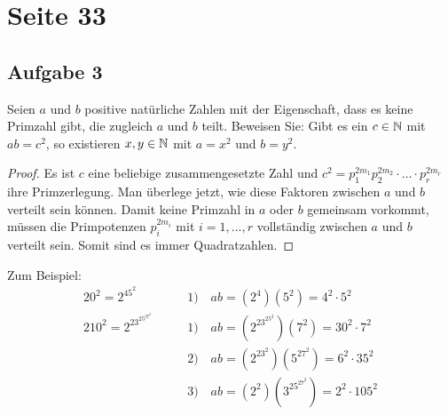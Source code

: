 \section{Seite 33}

\subsection{Aufgabe 3}
Seien $a$ und $b$ positive natürliche Zahlen mit der Eigenschaft, dass
es keine Primzahl gibt, die zugleich $a$ und $b$ teilt. Beweisen Sie:
Gibt es ein $c \in \mathbb{N}{}$ mit $ab = c^2$, so
existieren $x,y \in \mathbb{N}{}$ mit $a = x^2$ und $b = y^2$.
\begin{proof}
  Es ist $c$ eine beliebige zusammengesetzte Zahl und
  $c^2 = p_1^{2m_1}p_2^{2m_2} \cdot \ldots \cdot p_r^{2m_r}$
  ihre Primzerlegung. Man überlege jetzt,
  wie diese Faktoren zwischen $a$ und $b$ verteilt sein können.
  Damit keine Primzahl in $a$ oder $b$ gemeinsam vorkommt, müssen die
  Primpotenzen $p_i^{2m_i}$ mit $i = 1,\dotsc,r$ vollständig zwischen
  $a$ und $b$ verteilt sein. Somit sind es immer Quadratzahlen.
\end{proof}
\noindent
Zum Beispiel:
\begin{align*}
  20^2 = 2^45^2 \qquad        & 1) \quad ab = (2^4)(5^2) = 4^2 \cdot 5^2         \\[8pt]
  210^2 = 2^23^25^27^2 \qquad & 1) \quad ab = (2^23^25^2)(7^2) = 30^2 \cdot 7^2  \\
                              & 2) \quad ab = (2^23^2)(5^27^2) = 6^2 \cdot 35^2  \\
                              & 3) \quad ab = (2^2)(3^25^27^2) = 2^2 \cdot 105^2
\end{align*}

\newpage
